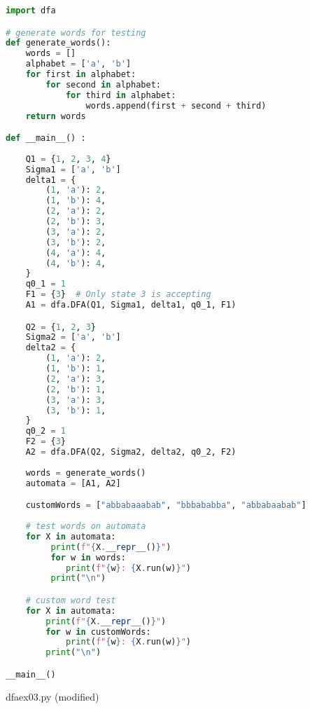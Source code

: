 \documentclass{article}
\theoremstyle{theorem}
\theoremstyle{definition}
\theoremstyle{remark}
\begin{document}
\begin{lstlisting}[language=Python]
import dfa

# generate words for testing
def generate_words():
    words = []
    alphabet = ['a', 'b']
    for first in alphabet:
        for second in alphabet:
            for third in alphabet:
                words.append(first + second + third)
    return words

def __main__() :
    
    Q1 = {1, 2, 3, 4}
    Sigma1 = ['a', 'b']
    delta1 = {
        (1, 'a'): 2,
        (1, 'b'): 4,
        (2, 'a'): 2,
        (2, 'b'): 3,
        (3, 'a'): 2,
        (3, 'b'): 2,
        (4, 'a'): 4,
        (4, 'b'): 4,
    }
    q0_1 = 1
    F1 = {3}  # Only state 3 is accepting
    A1 = dfa.DFA(Q1, Sigma1, delta1, q0_1, F1)

    Q2 = {1, 2, 3}
    Sigma2 = ['a', 'b']
    delta2 = {
        (1, 'a'): 2,
        (1, 'b'): 1,
        (2, 'a'): 3,
        (2, 'b'): 1,
        (3, 'a'): 3,
        (3, 'b'): 1,
    }
    q0_2 = 1
    F2 = {3}  
    A2 = dfa.DFA(Q2, Sigma2, delta2, q0_2, F2)
    
    words = generate_words()
    automata = [A1, A2]

    customWords = ["abbabaaabab", "bbbababba", "abbabaabab"]
    
    # test words on automata
    for X in automata:
         print(f"{X.__repr__()}")
         for w in words:
            print(f"{w}: {X.run(w)}")
         print("\n")

    # custom word test
    for X in automata:
        print(f"{X.__repr__()}")
        for w in customWords:
            print(f"{w}: {X.run(w)}")
        print("\n")

__main__()
\end{lstlisting}

dfaex03.py (modified)
\end{document}

